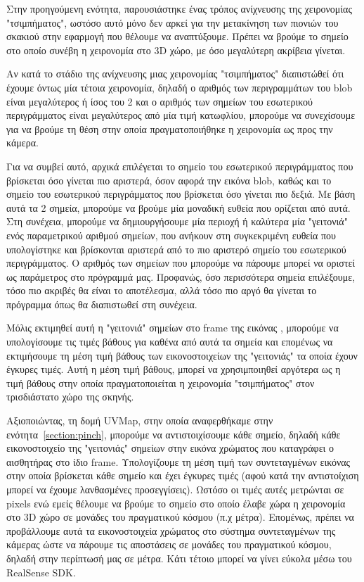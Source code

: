 Στην προηγούμενη ενότητα, παρουσιάστηκε ένας τρόπος ανίχνευσης της χειρονομίας "τσιμπήματος", ωστόσο αυτό μόνο δεν αρκεί για την μετακίνηση των πιονιών του σκακιού στην εφαρμογή που θέλουμε να αναπτύξουμε. Πρέπει να βρούμε το σημείο στο οποίο συνέβη η χειρονομία στο 3D χώρο, με όσο μεγαλύτερη ακρίβεια γίνεται. 



Αν κατά το στάδιο της ανίχνευσης μιας χειρονομίας "τσιμπήματος" διαπιστώθεί ότι έχουμε όντως μία τέτοια χειρονομία, δηλαδή ο αριθμός των περιγραμμάτων του blob είναι μεγαλύτερος ή ίσος του 2 και ο αριθμός των σημείων του εσωτερικού περιγράμματος είναι μεγαλύτερος από μία τιμή κατωφλίου, μπορούμε να συνεχίσουμε για να βρούμε τη θέση στην οποία πραγματοποιήθηκε η χειρονομία ως προς την κάμερα.

Για να συμβεί αυτό, αρχικά επιλέγεται το σημείο του εσωτερικού περιγράμματος που βρίσκεται όσο γίνεται πιο αριστερά, όσον αφορά την εικόνα blob, καθώς και το σημείο του εσωτερικού περιγράμματος που βρίσκεται όσο γίνεται πιο δεξιά. Με βάση αυτά τα 2 σημεία, μπορούμε να βρούμε μία μοναδική ευθεία που ορίζεται από αυτά. Στη συνέχεια, μπορούμε να δημιουργήσουμε μία περιοχή ή καλύτερα μία "γειτονιά"  ενός παραμετρικού αριθμού σημείων, που ανήκουν στη συγκεκριμένη ευθεία που υπολογίστηκε και βρίσκονται αριστερά από το πιο αριστερό σημείο του εσωτερικού περιγράμματος.  Ο αριθμός των σημείων που μπορούμε να πάρουμε μπορεί να οριστεί ως παράμετρος στο πρόγραμμά μας. Προφανώς, όσο περισσότερα σημεία επιλέξουμε, τόσο πιο ακριβές θα είναι το αποτέλεσμα, αλλά τόσο πιο αργό θα γίνεται το πρόγραμμα όπως θα διαπιστωθεί στη συνέχεια. 


Μόλις εκτιμηθεί αυτή η "γειτονιά" σημείων στο frame της εικόνας , μπορούμε να υπολογίσουμε τις τιμές βάθους για καθένα από αυτά τα σημεία και επομένως να εκτιμήσουμε τη μέση τιμή βάθους των εικονοστοιχείων της "γειτονιάς" τα οποία έχουν έγκυρες τιμές. Αυτή η μέση τιμή βάθους, μπορεί να χρησιμποιηθεί αργότερα ως η τιμή βάθους στην οποία πραγματοποιείται η χειρονομία "τσιμπήματος" στον τρισδιάστατο χώρο της σκηνής. 

Αξιοποιώντας, τη δομή UVMap, στην οποία αναφερθήκαμε στην ενότητα~\ref{section:pinch}, μπορούμε να αντιστοιχίσουμε κάθε σημείο, δηλαδή κάθε εικονοστοιχείο της "γειτονιάς" σημείων στην εικόνα χρώματος που καταγράφει ο αισθητήρας στο ίδιο frame. Υπολογίζουμε τη μέση τιμή των συντεταγμένων εικόνας στην οποία βρίσκεται κάθε σημείο και έχει έγκυρες τιμές (αφού κατά την αντιστοίχιση μπορεί να έχουμε λανθασμένες προσεγγίσεις). Ωστόσο οι τιμές αυτές μετρώνται σε pixels ενώ εμείς θέλουμε να βρούμε το σημείο στο οποίο έλαβε χώρα η χειρονομία στο 3D χώρο σε μονάδες του πραγματικού κόσμου (π.χ μέτρα). Επομένως, πρέπει να προβάλλουμε αυτά τα εικονοστοιχεία χρώματος στο σύστημα συντεταγμένων της κάμερας ώστε να πάρουμε τις αποστάσεις σε μονάδες του πραγματικού κόσμου, δηλαδή στην περίπτωσή μας σε μέτρα. Κάτι τέτοιο μπορεί να γίνει εύκολα μέσω του RealSense SDK.


